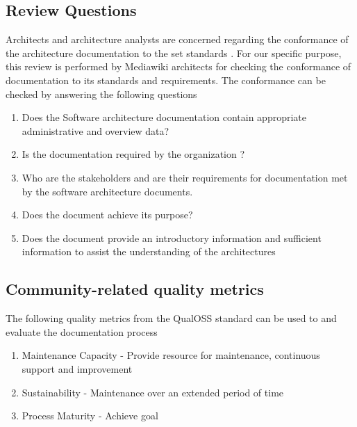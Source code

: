 \subsection{Review Questions}
\indent Architects and architecture analysts are concerned regarding the conformance of the architecture documentation to the set standards \cite{BachmannDocumentingSoftware2010}. For our specific purpose, this review is performed by Mediawiki architects for checking the conformance of documentation to its standards and requirements. The conformance can be checked by answering the following questions\cite{BachmannDocumentingSoftware2010}
\begin{enumerate}
\item Does the Software architecture documentation contain appropriate administrative and overview data?

\item Is the documentation required by the organization ?
\item Who are the stakeholders and are their requirements for documentation met by the software architecture documents.
\item Does the document achieve its purpose?
\item Does the document provide an introductory information and sufficient information to assist the understanding of the architectures
\end{enumerate}
\subsection{Community-related quality metrics} 
The following quality metrics from the QualOSS standard can be used to and evaluate the documentation process \cite{5314237}
\begin{enumerate}
\item Maintenance Capacity - Provide resource for maintenance, continuous support and improvement
\item Sustainability - Maintenance over an extended period of time
\item Process Maturity - Achieve goal
\end{enumerate}

